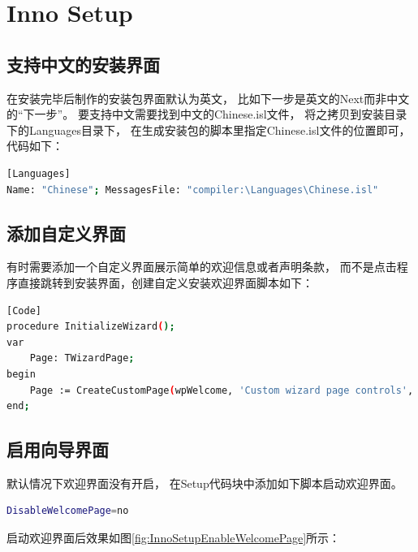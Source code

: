 \documentclass{book}
\begin{document}
\section{Inno Setup}

\subsection{支持中文的安装界面}

在安装完毕后制作的安装包界面默认为英文，
比如下一步是英文的Next而非中文的“下一步”。
要支持中文需要找到中文的Chinese.isl文件，
将之拷贝到安装目录下的Languages目录下，
在生成安装包的脚本里指定Chinese.isl文件的位置即可，
代码如下：

\begin{lstlisting}[language=Bash]
[Languages]
Name: "Chinese"; MessagesFile: "compiler:\Languages\Chinese.isl"
\end{lstlisting}

\subsection{添加自定义界面}

有时需要添加一个自定义界面展示简单的欢迎信息或者声明条款，
而不是点击程序直接跳转到安装界面，创建自定义安装欢迎界面脚本如下：

\begin{lstlisting}[language=Bash]
[Code]
procedure InitializeWizard();
var
	Page: TWizardPage;
begin
	Page := CreateCustomPage(wpWelcome, 'Custom wizard page controls', 'TButton and others');
end;
\end{lstlisting}

\subsection{启用向导界面}

默认情况下欢迎界面没有开启，
在Setup代码块中添加如下脚本启动欢迎界面。

\begin{lstlisting}[language=Bash]
DisableWelcomePage=no
\end{lstlisting}

启动欢迎界面后效果如图\ref{fig:InnoSetupEnableWelcomePage}所示：
\end{document}
